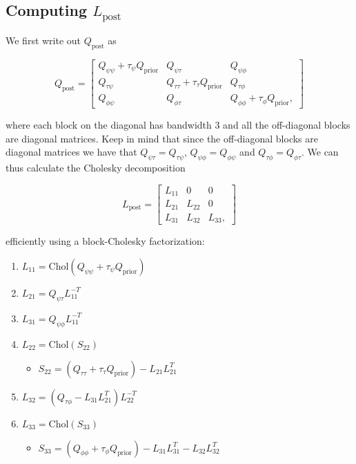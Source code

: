 \documentclass[
  letterpaper,
  DIV=11,
  numbers=noendperiod]{scrartcl}
\providecommand{\tightlist}{%
  \setlength{\itemsep}{0pt}\setlength{\parskip}{0pt}}\usepackage{longtable,booktabs,array}
\begin{document}
\subsection{\texorpdfstring{Computing
\(L_\text{post}\)}{Computing L\_\textbackslash text\{post\}}}\label{computing-l_textpost}

We first write out \(Q_\text{post}\) as

\[
Q_\text{post} = \begin{bmatrix}
Q_{\psi\psi} + \tau_\psi Q_\text{prior} & Q_{\psi\tau} & Q_{\psi\phi} \\
Q_{\tau\psi} & Q_{\tau\tau} + \tau_\tau Q_\text{prior} & Q_{\tau\phi} \\
Q_{\phi\psi} & Q_{\phi\tau} & Q_{\phi\phi} + \tau_\phi Q_\text{prior},
\end{bmatrix}
\]

where each block on the diagonal has bandwidth 3 and all the
off-diagonal blocks are diagonal matrices. Keep in mind that since the
off-diagonal blocks are diagonal matrices we have that
\(Q_{\psi\tau} = Q_{\tau\psi}\), \(Q_{\psi\phi} = Q_{\phi\psi}\) and
\(Q_{\tau\phi} = Q_{\phi\tau}\). We can thus calculate the Cholesky
decomposition

\[
L_\text{post} = \begin{bmatrix}
L_{11} & 0 & 0 \\
L_{21} & L_{22} & 0 \\
L_{31} & L_{32} & L_{33},
\end{bmatrix}
\]

efficiently using a block-Cholesky factorization:

\begin{enumerate}
\def\labelenumi{\arabic{enumi}.}
\tightlist
\item
  \(L_{11} = \mathrm{Chol}(Q_{\psi\psi} + \tau_\psi Q_\text{prior})\)
\item
  \(L_{21} = Q_{\psi\tau}L_{11}^{-T}\)
\item
  \(L_{31} = Q_{\psi\phi}L_{11}^{-T}\)
\item
  \(L_{22} = \mathrm{Chol}(S_{22})\)

  \begin{itemize}
  \tightlist
  \item
    \(S_{22} = \left(Q_{\tau\tau} + \tau_\tau Q_\text{prior}\right) - L_{21}L_{21}^T\)
  \end{itemize}
\item
  \(L_{32} = \left(Q_{\tau\phi} - L_{31}L_{21}^T\right)L_{22}^{-T}\)
\item
  \(L_{33} = \mathrm{Chol}(S_{33})\)

  \begin{itemize}
  \tightlist
  \item
    \(S_{33} = \left( Q_{\phi\phi} + \tau_\phi Q_\text{prior} \right) - L_{31}L_{31}^T - L_{32}L_{32}^T\)
  \end{itemize}
\end{enumerate}
\end{document}
